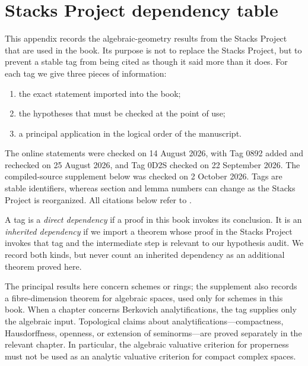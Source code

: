 \chapter{Stacks Project dependency table}
\label{app:stacks}

\newcommand{\stacktag}[1]{%
  \href{https://stacks.math.columbia.edu/tag/#1}{Tag~#1}}

This appendix records the algebraic-geometry results from the Stacks Project
that are used in the book. Its purpose is not to replace the Stacks Project,
but to prevent a stable tag from being cited as though it said more than it
does. For each tag we give three pieces of information:
\begin{enumerate}
\item the exact statement imported into the book;
\item the hypotheses that must be checked at the point of use;
\item a principal application in the logical order of the manuscript.
\end{enumerate}
The online statements were checked on 14 August 2026, with Tag 0892 added
and rechecked on 25 August 2026, and Tag 0D2S checked on
22 September 2026.  The compiled-source supplement below was checked
on 2 October 2026.  Tags are stable
identifiers, whereas section and lemma numbers can change as the Stacks
Project is reorganized. All citations below refer to
\cite{stacks-project}.

\begin{remark}
\label{rem:stacks-direct-inherited}
A tag is a \emph{direct dependency} if a proof in this book invokes its
conclusion. It is an \emph{inherited dependency} if we import a theorem
whose proof in the Stacks Project invokes that tag and the intermediate step
is relevant to our hypothesis audit. We record both kinds, but never count
an inherited dependency as an additional theorem proved here.
\end{remark}

\begin{remark}
\label{rem:stacks-scheme-boundary}
The principal results here concern schemes or rings; the supplement also
records a fibre-dimension theorem for algebraic spaces, used only for
schemes in this book. When a chapter
concerns Berkovich analytifications, the tag supplies only the algebraic
input. Topological claims about analytifications---compactness,
Hausdorffness, openness, or extension of seminorms---are proved separately
in the relevant chapter. In particular, the algebraic valuative criterion
for properness must not be used as an analytic valuative criterion for
compact complex spaces.
\end{remark}

